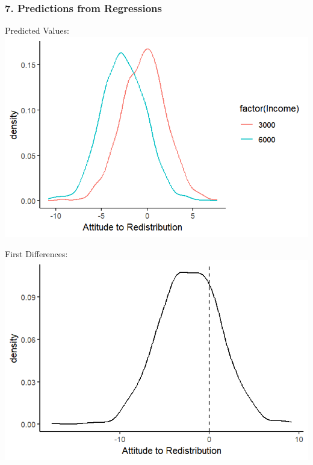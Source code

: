 \documentclass[xcolor=x11names,compress]{beamer}\usepackage[]{graphicx}\usepackage[]{color}
\makeatletter
\def\maxwidth{ %
  \ifdim\Gin@nat@width>\linewidth
    \linewidth
  \else
    \Gin@nat@width
  \fi
}
\newenvironment{knitrout}{}{} %
\renewcommand{\(}{\begin{columns}}
\renewcommand{\)}{\end{columns}}
\newcommand{\<}[1]{\begin{column}{#1}}
\renewcommand{\>}{\end{column}}
\makeatother
\begin{document}
\begin{frame}
\frametitle{7. Predictions from Regressions}
\begin{multicols}{2}
Predicted Values:
\begin{knitrout}
\color{fgcolor}
\includegraphics[width=\maxwidth]{figure/predictions2-1} 

\end{knitrout}
\columnbreak
First Differences:
\begin{knitrout}
\color{fgcolor}
\includegraphics[width=\maxwidth]{figure/predictions3-1} 

\end{knitrout}
\end{multicols}
\end{frame}
\end{document}

